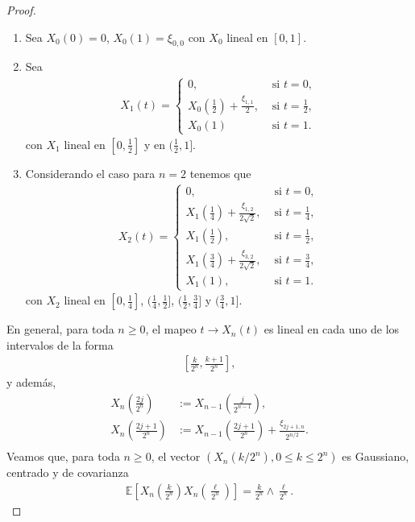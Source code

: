 \begin{proof}
	\begin{enumerate}
	\item Sea $X_0 (0) = 0$, $X_0 (1) = \xi_{0, 0}$ con $X_0$ lineal en $[0, 1]$.
	\item Sea 
		\begin{align*}
		X_1 (t) = 
			\begin{cases}
			0, & \text{ si } t = 0, \\
			X_0 (\frac{1}{2}) + \frac{\xi_{1, 1}}{2}, & \text{ si } t = \frac{1}{2}, \\
			X_0 (1) & \text{ si } t = 1.
			\end{cases}
		\end{align*}
con $X_1$ lineal en $[0, \frac{1}{2}]$ y en $(\frac{1}{2}, 1]$. 
	\item Considerando el caso para $n = 2$ tenemos que
		\begin{align*}
		X_2 (t) = 
			\begin{cases}
			0, & \text{ si } t = 0, \\
			X_1 (\frac{1}{4}) + \frac{\xi_{1, 2}}{2 \sqrt{2}}, & \text{ si } t = \frac{1}{4}, \\
			X_1 (\frac{1}{2}), & \text{ si } t = \frac{1}{2}, \\
			X_1 (\frac{3}{4}) + \frac{\xi_{3, 2}}{2 \sqrt{2}}, & \text{ si } t = \frac{3}{4}, \\
			X_1 (1), & \text{ si } t = 1.
			\end{cases}
		\end{align*}
con $X_2$ lineal en $[0, \frac{1}{4}]$, $(\frac{1}{4}, \frac{1}{2}]$, $(\frac{1}{2}, \frac{3}{4}]$ y $(\frac{3}{4}, 1]$.
	\end{enumerate}
En general, para toda $n \geq 0$, el mapeo $t \rightarrow X_n (t)$ es lineal en cada uno de los intervalos de la forma
	\begin{align*}
		\left[ \frac{k}{2^n}, \frac{k+1}{2^n} \right],
	\end{align*}
y además, 
	\begin{align*}
		X_n \left(\frac{2j}{2^n}\right) & := X_{n-1} \left(\frac{j}{2^{n-1}}\right), \\
		X_n \left(\frac{2j + 1}{2^n}\right) & := X_{n-1} \left(\frac{2j + 1}{2^n}\right) + \frac{\xi_{2j + 1, n}}{2^{n/2}}. \\
	\end{align*}
Veamos que, para toda $n \geq 0$, el vector $(X_n(k / 2^n), 0 \leq k \leq 2^n)$ es Gaussiano, centrado y de covarianza
	\begin{align}
		\mathbb{E} \left[ X_n \left( \frac{k}{2^n} \right) X_n \left( \frac{\ell}{2^n} \right) \right] = \frac{k}{2^n} \wedge \frac{\ell}{2^n}. \label{abv}

\end{align}
\end{proof}
